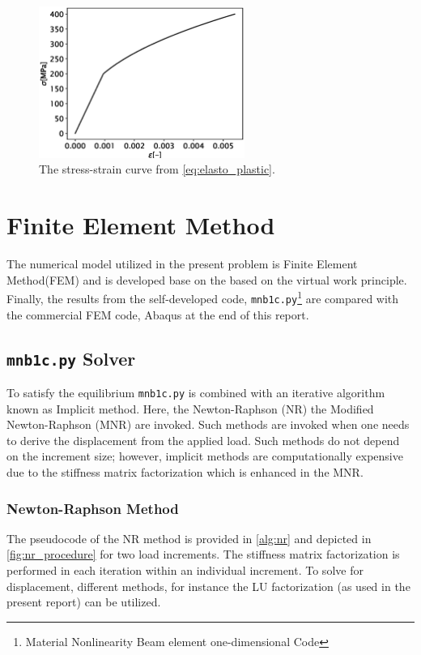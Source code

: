 \documentclass{article}
\begin{document}
\begin{figure}[H]
    \centering
    \includegraphics[width = 0.6\textwidth ]{figures/stress_strain.eps}
    \caption{The stress-strain curve from \cref{eq:elasto_plastic}.}
    \label{fig:stress_strain}
\end{figure}

\section{Finite Element Method}
The numerical model utilized in the present problem is Finite Element Method(FEM) and is developed base on the based on the virtual work principle. Finally, the results from the self-developed code, \texttt{mnb1c.py}\footnote{Material Nonlinearity Beam element one-dimensional Code} are compared with the commercial FEM code, Abaqus at the end of this report. 

\subsection{\texttt{mnb1c.py} Solver}
To satisfy the equilibrium \texttt{mnb1c.py} is combined with an iterative algorithm known as Implicit method. Here, the Newton-Raphson (NR) the Modified Newton-Raphson (MNR) are invoked. Such methods are invoked when one needs to derive the displacement from the applied load. Such methods do not depend on the increment size; however, implicit methods are computationally expensive due to the stiffness matrix factorization which is enhanced in the MNR.

\subsubsection{Newton-Raphson Method}
The pseudocode of the NR method is provided in \cref{alg:nr} and depicted in \cref{fig:nr_procedure} for two load increments. The stiffness matrix factorization is performed in each iteration within an individual increment. To solve for displacement, different methods, for instance the LU factorization (as used in the present report) can be utilized.
\end{document}
